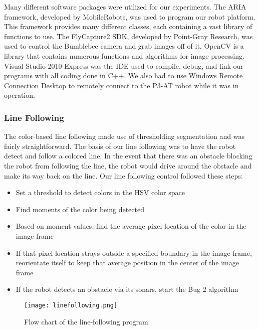 \documentclass[12pt]{article}
\begin{document}
Many different software packages were utilized for our experiments. The ARIA framework, developed by MobileRobots, was used to program our robot platform. This framework provides many different classes, each containing a vast library of functions to use. The FlyCapture2 SDK, developed by Point-Gray Research, was used to control the Bumblebee camera and grab images off of it. OpenCV is a library that contains numerous functions and algorithms for image processing. Visual Studio 2010 Express was the IDE used to compile, debug, and link our programs with all coding done in C++. We also had to use Windows Remote Connection Desktop to remotely connect to the P3-AT robot while it was in operation. 


\subsubsection{Line Following} \label{sec:linecontrol}

The color-based line following made use of thresholding segmentation and was fairly straightforward. The basis of our line following was to have the robot detect and follow a colored line. In the event that there was an obstacle blocking the robot from following the line, the robot would drive around the obstacle and make its way back on the line. Our line following control followed these steps:
\begin{itemize}
	\item Set a threshold to detect colors in the HSV color space
	\item Find moments of the color being detected
	\item Based on moment values, find the average pixel location of the color in the image frame
	\item If that pixel location strays outside a specified boundary in the image frame, reorientate itself to keep that average position in the center of the image frame
	\item If the robot detects an obstacle via its sonars, start the Bug 2 algorithm
\end{itemize}

\begin{figure}[htp!]
	\begin{center}
		\texttt{[image: linefollowing.png]}
		\caption{Flow chart of the line-following program}
	\end{center}
\end{figure}
\end{document}
